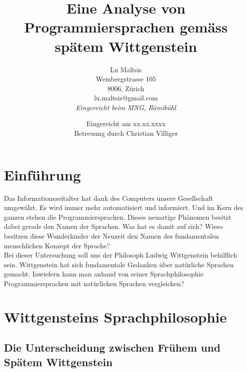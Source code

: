 \documentclass[10pt,a4paper]{article}
\begin{document}
\title{\Large{\textbf{Eine Analyse von Programmiersprachen gemäss spätem Wittgenstein}}}
\author{Lu Maltsis \\
Weinbergstrasse 105 \\
8006, Zürich \\
lu.maltsis@gmail.com \\
\textit{Eingereicht beim MNG, Rämibühl}
}
\date{Eingereicht am xx.xx.xxxx \\
\vspace{10mm}
Betreuung durch Christian Villiger}
\maketitle
\newpage

\setcounter{section}{-1}
\tableofcontents{}

\section{Einführung}
Das Informationszeitalter hat dank des Computers unsere Gesellschaft umgewälzt. Es wird immer mehr automatisiert und informiert. Und im Kern des ganzen stehen die Programmiersprachen. Dieses neuartige Phänomen besitzt dabei gerade den Namen der Sprachen. Was hat es damit auf sich? Wieso besitzen diese Wunderkinder der Neuzeit den Namen des fundamentalen menschlichen Konzept der Sprache? \\
Bei dieser Untersuchung soll uns der Philosoph Ludwig Wittgenstein behilflich sein. Wittgenstein hat sich fundamentale Gedanken über natürliche Sprachen gemacht. Inwiefern kann man anhand von seiner Sprachphilosophie Programmiersprachen mit natürlichen Sprachen vergleichen?


\section{Wittgensteins Sprachphilosophie}

\subsection{Die Unterscheidung zwischen Frühem und Spätem Wittgenstein}
\end{document}
